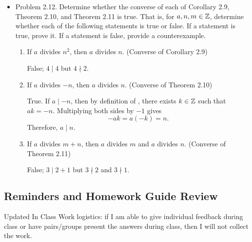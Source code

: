 \documentclass{ximera}
\begin{document}
\begin{pre}
\begin{itemize}
 \item Problem 2.12. Determine whether the converse of each of Corollary 2.9, Theorem 2.10, and Theorem 2.11 is true. That is, for $a,n,m\in\mathbb Z$, determine whether each of the following statements is true or false. If a statement is true, prove it. If a statement is false, provide a counterexample.
  \begin{enumerate}%
\item  If $a$ divides $n^2$, then $a$ divides $n$. (Converse of Corollary 2.9)
\begin{solution}
 False; $4\mid 4$ but $4\nmid 2$.
\end{solution}
\item If $a$ divides $-n$, then $a$ divides $n$. (Converse of Theorem 2.10)
\begin{solution}
 True. If $a\mid -n$, then by definition of , there exists $k\in\mathbb Z$ such that $ak=-n$. Multiplying both sides by $-1$ gives \[-ak=a(-k)=n.\] Therefore, $a\mid n$.
\end{solution}
\item If $a$ divides $m+n$, then $a$ divides $m$ and $a$ divides $n$.
 (Converse of Theorem 2.11)
 
\begin{solution}
 False; $3\mid 2+1$ but $3\nmid 2$ and $3\nmid 1$.
\end{solution}
\end{enumerate}
\end{itemize}
\end{pre}


\subsection{Reminders and Homework Guide Review}%
Updated In Class Work logistics: if I am able to give individual feedback during class or have pairs/groups present the answers during class, then I will not collect the work. 
\end{document}
